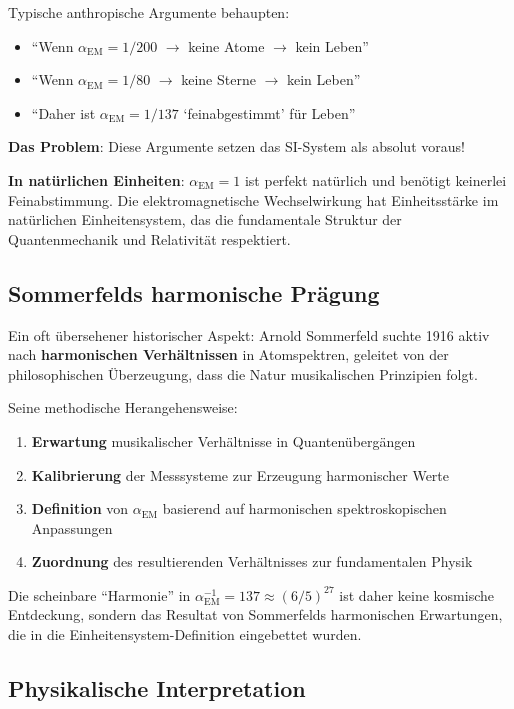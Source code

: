 Typische anthropische Argumente behaupten:
\begin{itemize}
	\item ``Wenn $\alpha_{\text{EM}} = 1/200$ $\rightarrow$ keine Atome $\rightarrow$ kein Leben''
	\item ``Wenn $\alpha_{\text{EM}} = 1/80$ $\rightarrow$ keine Sterne $\rightarrow$ kein Leben''
	\item ``Daher ist $\alpha_{\text{EM}} = 1/137$ `feinabgestimmt' für Leben''
\end{itemize}

\textbf{Das Problem}: Diese Argumente setzen das SI-System als absolut voraus!

\textbf{In natürlichen Einheiten}: $\alpha_{\text{EM}} = 1$ ist perfekt natürlich und benötigt keinerlei Feinabstimmung. Die elektromagnetische Wechselwirkung hat Einheitsstärke im natürlichen Einheitensystem, das die fundamentale Struktur der Quantenmechanik und Relativität respektiert.

\subsection{Sommerfelds harmonische Prägung}
\label{subsec:sommerfeld_harmonic}

Ein oft übersehener historischer Aspekt: Arnold Sommerfeld suchte 1916 aktiv nach \textbf{harmonischen Verhältnissen} in Atomspektren, geleitet von der philosophischen Überzeugung, dass die Natur musikalischen Prinzipien folgt.

Seine methodische Herangehensweise:
\begin{enumerate}
	\item \textbf{Erwartung} musikalischer Verhältnisse in Quantenübergängen
	\item \textbf{Kalibrierung} der Messsysteme zur Erzeugung harmonischer Werte
	\item \textbf{Definition} von $\alpha_{\text{EM}}$ basierend auf harmonischen spektroskopischen Anpassungen
	\item \textbf{Zuordnung} des resultierenden Verhältnisses zur fundamentalen Physik
\end{enumerate}

Die scheinbare ``Harmonie'' in $\alpha_{\text{EM}}^{-1} = 137 \approx (6/5)^{27}$ ist daher keine kosmische Entdeckung, sondern das Resultat von Sommerfelds harmonischen Erwartungen, die in die Einheitensystem-Definition eingebettet wurden.

\subsection{Physikalische Interpretation}
\label{subsec:physical_interpretation}

